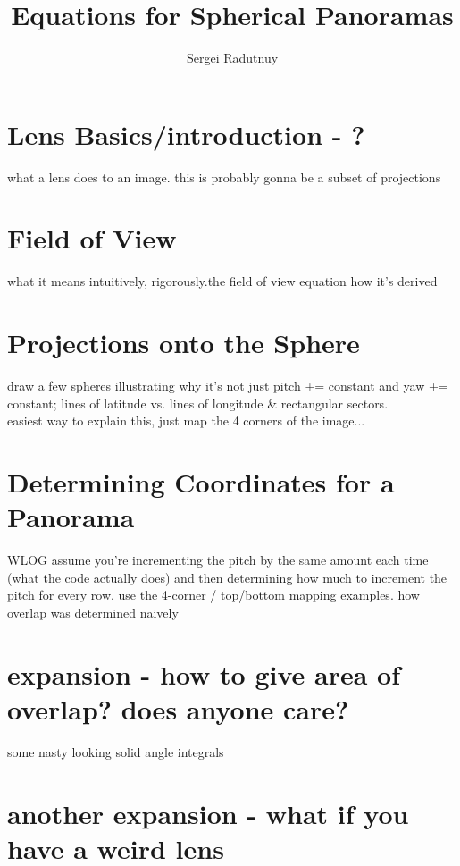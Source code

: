 \documentclass{article}
\title{Equations for Spherical Panoramas}
\author{Sergei Radutnuy}
\begin{document}
\maketitle
\section{Lens Basics/introduction - ?}
what a lens does to an image. this is probably gonna be a subset of projections
\section{Field of View}
what it means intuitively, rigorously.the field of view 
equation how it's derived
\section{Projections onto the Sphere}
draw a few spheres illustrating why it's not just pitch += constant 
and yaw += constant; lines of latitude vs. lines of longitude \& rectangular
sectors.
\\
easiest way to explain this, just map the 4 corners of the image...
\section{Determining Coordinates for a Panorama}
WLOG assume you're incrementing the pitch by the same amount each time
(what the code actually does) and then determining how much to increment the
pitch for every row. use the 4-corner / top/bottom mapping examples. how 
overlap was determined naively

\section{expansion - how to give area of overlap? does anyone care?}
some nasty looking solid angle integrals
\section{another expansion - what if you have a weird lens}
\end{document}
